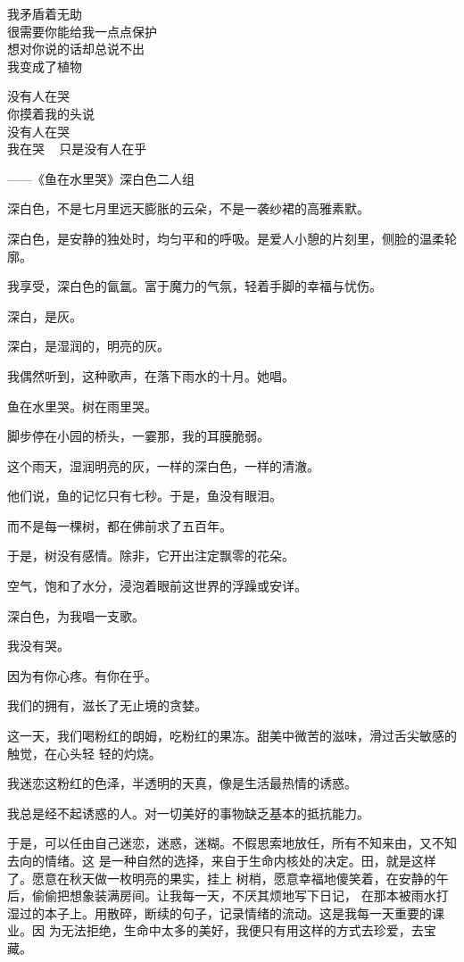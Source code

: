 \documentclass[12pt,a4paper]{article}
\begin{document}
		我矛盾着无助 \\
		很需要你能给我一点点保护 \\
		想对你说的话却总说不出 \\
		我变成了植物


		没有人在哭 \\
		你摸着我的头说 \\
		没有人在哭 \\
		我在哭 ~ 只是没有人在乎

		——《鱼在水里哭》深白色二人组
		\endlongpoem


		深白色，不是七月里远天膨胀的云朵，不是一袭纱裙的高雅素默。\par
		深白色，是安静的独处时，均匀平和的呼吸。是爱人小憩的片刻里，侧脸的温柔轮廓。\par
		我享受，深白色的氤氲。富于魔力的气氛，轻着手脚的幸福与忧伤。\par
		深白，是灰。\par
		深白，是湿润的，明亮的灰。\par
		我偶然听到，这种歌声，在落下雨水的十月。她唱。\par
		鱼在水里哭。树在雨里哭。\par
		脚步停在小园的桥头，一霎那，我的耳膜脆弱。\par
		这个雨天，湿润明亮的灰，一样的深白色，一样的清澈。\par
		他们说，鱼的记忆只有七秒。于是，鱼没有眼泪。\par
		而不是每一棵树，都在佛前求了五百年。\par
		于是，树没有感情。除非，它开出注定飘零的花朵。\par
		空气，饱和了水分，浸泡着眼前这世界的浮躁或安详。\par
		深白色，为我唱一支歌。\par
		我没有哭。\par
		因为有你心疼。有你在乎。

	\endwriting



		我们的拥有，滋长了无止境的贪婪。

		这一天，我们喝粉红的朗姆，吃粉红的果冻。甜美中微苦的滋味，滑过舌尖敏感的触觉，在心头轻
	轻的灼烧。

		我迷恋这粉红的色泽，半透明的天真，像是生活最热情的诱惑。\par
		我总是经不起诱惑的人。对一切美好的事物缺乏基本的抵抗能力。

		于是，可以任由自己迷恋，迷惑，迷糊。不假思索地放任，所有不知来由，又不知去向的情绪。这
	是一种自然的选择，来自于生命内核处的决定。田，就是这样了。愿意在秋天做一枚明亮的果实，挂上
	树梢，愿意幸福地傻笑着，在安静的午后，偷偷把想象装满房间。让我每一天，不厌其烦地写下日记，
	在那本被雨水打湿过的本子上。用散碎，断续的句子，记录情绪的流动。这是我每一天重要的课业。因
	为无法拒绝，生命中太多的美好，我便只有用这样的方式去珍爱，去宝藏。
\end{document}
